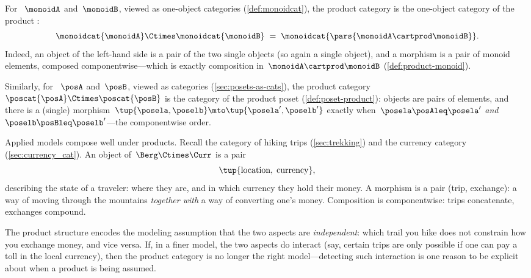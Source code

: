 \begin{example}
    \label{exa:product-cat-monoids}
    For ~$\monoidA$ and~$\monoidB$, viewed as one-object categories (\cref{def:monoidcat}), the product category is the one-object category of the product :
    \begin{equation}
        \monoidcat{\monoidA} \Ctimes \monoidcat{\monoidB}
        \; = \;
        \monoidcat{\pars{\monoidA \cartprod \monoidB}}.
    \end{equation}
    Indeed, an object of the left-hand side is a pair of the two single objects (so again a single object), and a morphism is a pair of monoid elements, composed componentwise---which is exactly composition in~$\monoidA \cartprod \monoidB$ (\cref{def:product-monoid}).
\end{example}

\begin{example}
    \label{exa:product-cat-posets}
    Similarly, for ~$\posA$ and~$\posB$, viewed as categories (\cref{sec:posets-as-cats}), the product category~$\poscat{\posA} \Ctimes \poscat{\posB}$ is the category of the product poset (\cref{def:poset-product}): objects are pairs of elements, and there is a (single) morphism~$\tup{\posela, \poselb} \mto \tup{\posela', \poselb'}$ exactly when~$\posela \posAleq \posela'$ \emph{and}~$\poselb \posBleq \poselb'$---the componentwise order.
\end{example}

\begin{example}
    \label{exa:product-cat-travel-money}
    Applied models compose well under products.
    Recall the category \Berg of hiking trips (\cref{sec:trekking}) and the currency category \Curr (\cref{sec:currency_cat}).
    An object of~$\Berg \Ctimes \Curr$ is a pair
    \begin{equation}
        \tup{\text{location}, \; \text{currency}},
    \end{equation}
    describing the state of a traveler: where they are, and in which currency they hold their money.
    A morphism is a pair (trip, exchange): a way of moving through the mountains \emph{together with} a way of converting one's money.
    Composition is componentwise: trips concatenate, exchanges compound.

    The product structure encodes the modeling assumption that the two aspects are \emph{independent}: which trail you hike does not constrain how you exchange money, and vice versa.
    If, in a finer model, the two aspects do interact (say, certain trips are only possible if one can pay a toll in the local currency), then the product category is no longer the right model---detecting such interaction is one reason to be explicit about when a product is being assumed.
\end{example}

